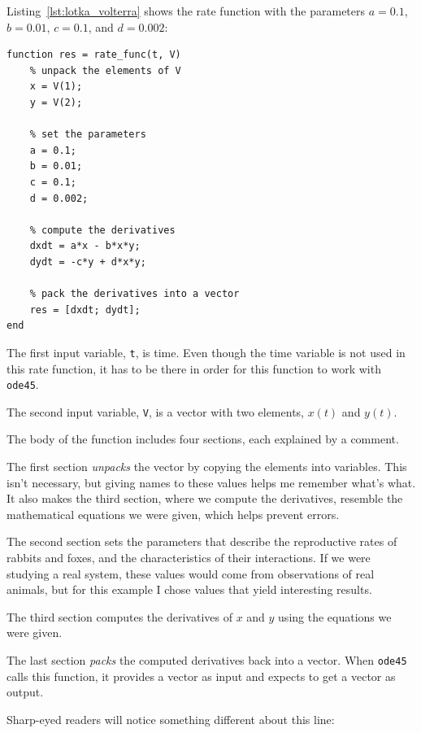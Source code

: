 
Listing~\ref{lst:lotka_volterra} shows the rate function
with the parameters $a = 0.1$, $b = 0.01$, $c = 0.1$, and $d = 0.002$:

\begin{lstlisting}[caption={A rate function for Lotka-Volterra}, label={lst:lotka_volterra}]
function res = rate_func(t, V)
    % unpack the elements of V
    x = V(1);
    y = V(2);

    % set the parameters
    a = 0.1;
    b = 0.01;
    c = 0.1;
    d = 0.002;

    % compute the derivatives
    dxdt = a*x - b*x*y;
    dydt = -c*y + d*x*y;

    % pack the derivatives into a vector
    res = [dxdt; dydt];
end
\end{lstlisting}

The first input variable, {\tt t}, is time.
Even though the time variable is not used in this rate function,
it has to be there in order for this function to work with {\tt ode45}.

The second input variable, {\tt V}, is a vector with two elements,
$x(t)$ and $y(t)$.

The body of the function includes four sections, each explained by a comment.

The first section {\em unpacks} the vector by copying the elements
into variables.  This isn't necessary, but giving names to
these values helps me remember what's what.  It also makes the third
section, where we compute the derivatives, resemble the mathematical
equations we were given, which helps prevent errors.


The second section sets the parameters that describe the
reproductive rates of rabbits and foxes, and the characteristics of
their interactions.  If we were studying a real system, these values
would come from observations of real animals, but for this example
I chose values that yield interesting results.


The third section computes the derivatives of $x$ and $y$ using the equations
we were given.

The last section {\em packs} the computed derivatives back into a
vector.  When {\tt ode45} calls this function, it provides a vector
as input and expects to get a vector as output.

Sharp-eyed readers will notice something different about this line:

